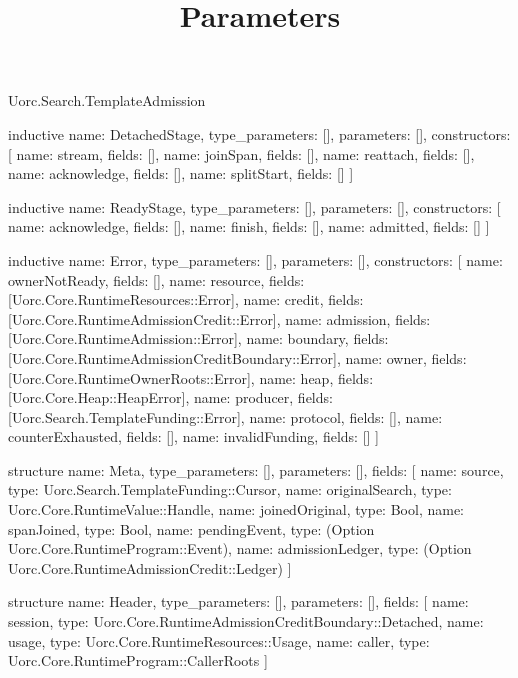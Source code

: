 \begin{lexlean}{Uorc.Search.TemplateAdmission}
\title{Parameters}
\begin{semanticmodule}
inductive{
  name: DetachedStage,
  type_parameters: [],
  parameters: [],
  constructors: [
    {name: stream, fields: []},
    {name: joinSpan, fields: []},
    {name: reattach, fields: []},
    {name: acknowledge, fields: []},
    {name: splitStart, fields: []}
  ]
}

inductive{
  name: ReadyStage,
  type_parameters: [],
  parameters: [],
  constructors: [
    {name: acknowledge, fields: []},
    {name: finish, fields: []},
    {name: admitted, fields: []}
  ]
}

inductive{
  name: Error,
  type_parameters: [],
  parameters: [],
  constructors: [
    {name: ownerNotReady, fields: []},
    {name: resource, fields: [Uorc.Core.RuntimeResources::Error]},
    {name: credit, fields: [Uorc.Core.RuntimeAdmissionCredit::Error]},
    {name: admission, fields: [Uorc.Core.RuntimeAdmission::Error]},
    {name: boundary, fields: [Uorc.Core.RuntimeAdmissionCreditBoundary::Error]},
    {name: owner, fields: [Uorc.Core.RuntimeOwnerRoots::Error]},
    {name: heap, fields: [Uorc.Core.Heap::HeapError]},
    {name: producer, fields: [Uorc.Search.TemplateFunding::Error]},
    {name: protocol, fields: []},
    {name: counterExhausted, fields: []},
    {name: invalidFunding, fields: []}
  ]
}

structure{
  name: Meta,
  type_parameters: [],
  parameters: [],
  fields: [
    {name: source, type: Uorc.Search.TemplateFunding::Cursor},
    {name: originalSearch, type: Uorc.Core.RuntimeValue::Handle},
    {name: joinedOriginal, type: Bool},
    {name: spanJoined, type: Bool},
    {name: pendingEvent, type: (Option Uorc.Core.RuntimeProgram::Event)},
    {name: admissionLedger, type: (Option Uorc.Core.RuntimeAdmissionCredit::Ledger)}
  ]
}

structure{
  name: Header,
  type_parameters: [],
  parameters: [],
  fields: [
    {name: session, type: Uorc.Core.RuntimeAdmissionCreditBoundary::Detached},
    {name: usage, type: Uorc.Core.RuntimeResources::Usage},
    {name: caller, type: Uorc.Core.RuntimeProgram::CallerRoots}
  ]
}


\end{semanticmodule}
\end{lexlean}
